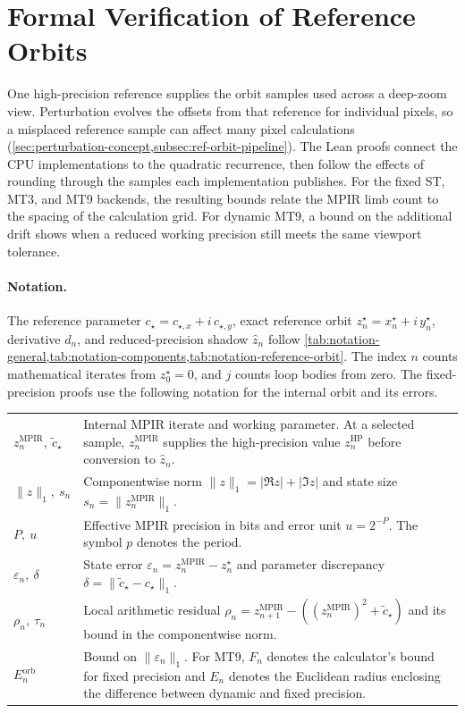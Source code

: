 \section{Formal Verification of Reference Orbits}
\label{sec:reference-orbit-proofs}

One high-precision reference supplies the orbit samples used across a
deep-zoom view. Perturbation evolves the offsets from that reference for
individual pixels, so a misplaced reference sample can affect many pixel
calculations (\cref{sec:perturbation-concept,subsec:ref-orbit-pipeline}).
The Lean proofs connect the CPU implementations to the quadratic recurrence,
then follow the effects of rounding through the samples each implementation
publishes. For the fixed ST, MT3, and MT9 backends, the resulting bounds
relate the MPIR limb count to the spacing of the calculation grid.
For dynamic MT9, a bound on the additional drift shows when a reduced
working precision still meets the same viewport tolerance.

\paragraph{Notation.}
The reference parameter \(c_\star=c_{\star,x}+i\,c_{\star,y}\), exact
reference orbit \(z_n^\star=x_n^\star+i\,y_n^\star\), derivative \(d_n\),
and reduced-precision shadow \(\hat z_n\) follow
\cref{tab:notation-general,tab:notation-components,tab:notation-reference-orbit}.
The index \(n\) counts mathematical iterates from \(z_0^\star=0\), and \(j\)
counts loop bodies from zero. The fixed-precision proofs use the following
notation for the internal orbit and its errors.

\begin{center}
\begin{tabularx}{\linewidth}{@{}l>{\raggedright\arraybackslash}X@{}}
\(z_n^{\mathrm{MPIR}},\ \widetilde c_\star\) & Internal MPIR iterate and working
parameter. At a selected sample, \(z_n^{\mathrm{MPIR}}\) supplies the
high-precision value \(z_n^{\mathrm{HP}}\) before conversion to \(\hat z_n\). \\
\(\lVert z\rVert_1,\ s_n\) & Componentwise norm
\(\lVert z\rVert_1=|\Re z|+|\Im z|\) and state size
\(s_n=\lVert z_n^{\mathrm{MPIR}}\rVert_1\). \\
\(P,\ u\) & Effective MPIR precision in bits and error unit \(u=2^{-P}\).
The symbol \(p\) denotes the period. \\
\(\varepsilon_n,\ \delta\) & State error
\(\varepsilon_n=z_n^{\mathrm{MPIR}}-z_n^\star\) and parameter discrepancy
\(\delta=\lVert\widetilde c_\star-c_\star\rVert_1\). \\
\(\rho_n,\ \tau_n\) & Local arithmetic residual
\(\rho_n=z_{n+1}^{\mathrm{MPIR}}-((z_n^{\mathrm{MPIR}})^2+\widetilde c_\star)\)
and its bound in the componentwise norm. \\
\(E_n^{\mathrm{orb}}\) & Bound on \(\lVert\varepsilon_n\rVert_1\).
For MT9, \(F_n\) denotes the calculator's bound for fixed precision and
\(E_n\) denotes the Euclidean radius enclosing the difference between
dynamic and fixed precision. \\
\end{tabularx}
\end{center}

